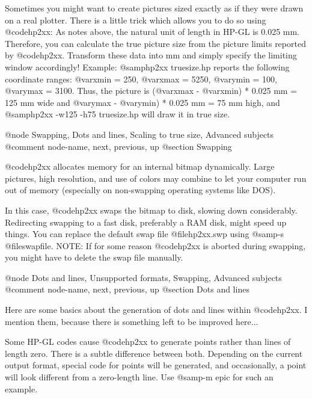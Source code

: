 Sometimes you might want to create pictures sized exactly as if they
were drawn on a real plotter. There is a little trick which allows
you to do so using @code{hp2xx}: As notes above, the natural unit of
length in HP-GL is 0.025 mm. Therefore, you can calculate the true
picture size from the picture limits reported by @code{hp2xx}. Transform
these data into mm and simply specify the limiting window accordingly!
Example:
@samp{hp2xx truesize.hp} reports the following coordinate ranges:
@var{xmin} = 250, @var{xmax} = 5250, @var{ymin} = 100, @var{ymax} = 3100.
Thus, the picture is (@var{xmax} - @var{xmin}) * 0.025 mm = 125 mm wide
and @var{ymax} - @var{ymin}) * 0.025 mm = 75 mm high, and
@samp{hp2xx -w125 -h75 truesize.hp} will draw it in true size.




@node Swapping, Dots and lines, Scaling to true size, Advanced subjects
@comment  node-name,  next,  previous,  up
@section Swapping

@code{hp2xx} allocates memory for an internal bitmap dynamically.
Large pictures, high resolution, and use of colors may combine to
let your computer run out of memory (especially on non-swapping operating
systems like DOS).

In this case, @code{hp2xx} swaps the bitmap to disk, slowing down
considerably. Redirecting swapping to a fast disk, preferably a RAM disk,
might speed up things. You can replace the default swap file
@file{hp2xx.swp} using @samp{-s @file{swapfile}}.
NOTE: If for some reason @code{hp2xx} is aborted during swapping, you might
have to delete the swap file manually.





@node Dots and lines, Unsupported formats, Swapping, Advanced subjects
@comment  node-name,  next,  previous,  up
@section Dots and lines

Here are some basics about the generation of dots and lines within
@code{hp2xx}. I mention them, because there is something left to be
improved here...

Some HP-GL codes cause @code{hp2xx} to generate points rather than lines
of length zero. There is a subtle difference between both. Depending
on the current output format, special code for points will be generated,
and occasionally, a point will look different from a zero-length line.
Use @samp{-m epic} for such an example.

